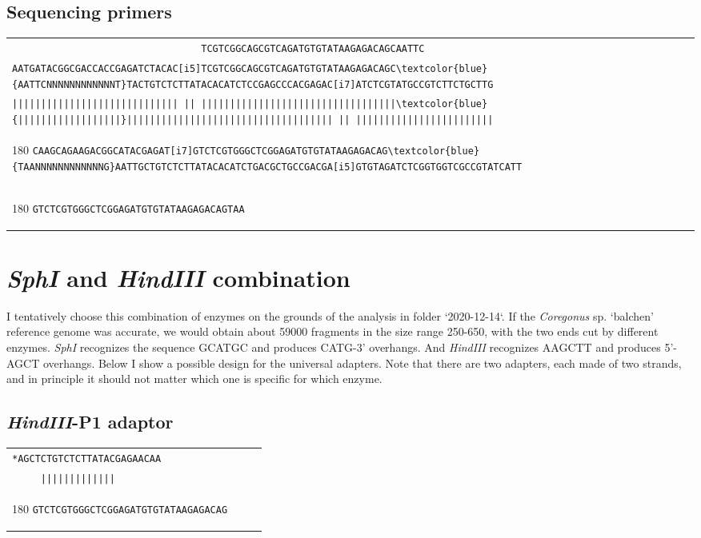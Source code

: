 \documentclass[a4paper,12pt]{article}
\begin{document}
\begin{flushleft}
\subsection*{Sequencing primers}
\begin{tabular}{l}
\Verb+                                 TCGTCGGCAGCGTCAGATGTGTATAAGAGACAGCAATTC+\\[-8pt]
\Verb+AATGATACGGCGACCACCGAGATCTACAC[i5]TCGTCGGCAGCGTCAGATGTGTATAAGAGACAGC\textcolor{blue}{AATTCNNNNNNNNNNNNT}TACTGTCTCTTATACACATCTCCGAGCCCACGAGAC[i7]ATCTCGTATGCCGTCTTCTGCTTG+\\[-10pt]
\Verb+||||||||||||||||||||||||||||| || ||||||||||||||||||||||||||||||||||\textcolor{blue}{||||||||||||||||||}|||||||||||||||||||||||||||||||||||| || ||||||||||||||||||||||||+\\[-12pt]
\begin{turn}{180}
   \Verb+CAAGCAGAAGACGGCATACGAGAT[i7]GTCTCGTGGGCTCGGAGATGTGTATAAGAGACAG\textcolor{blue}{TAANNNNNNNNNNNNG}AATTGCTGTCTCTTATACACATCTGACGCTGCCGACGA[i5]GTGTAGATCTCGGTGGTCGCCGTATCATT+
\end{turn}
\\[-8pt]
\begin{turn}{180}
   \Verb+GTCTCGTGGGCTCGGAGATGTGTATAAGAGACAGTAA                                                                                    +
\end{turn}
\\
\end{tabular}
\vspace*{0.3cm}


\section{\emph{SphI} and \emph{HindIII} combination}
I tentatively choose this combination of enzymes on the grounds of the analysis in folder `2020-12-14`. If the \emph{Coregonus} sp. `balchen' reference genome was accurate, we would obtain about 59000 fragments in the size range 250-650, with the two ends cut by different enzymes. \emph{SphI} recognizes the sequence \textsf{GCATGC} and produces \textsf{CATG}-3' overhangs. And \emph{HindIII} recognizes \textsf{AAGCTT} and produces 5'-\textsf{AGCT} overhangs. Below I show a possible design for the universal adapters. Note that there are two adapters, each made of two strands, and in principle it should not matter which one is specific for which enzyme.

\subsection*{\emph{HindIII}-P1 adaptor}
\begin{tabular}{l}
\verb+*AGCTCTGTCTCTTATACGAGAACAA+\\
\verb+     |||||||||||||+\\[-8pt]
   \begin{turn}{180}
   \verb+GTCTCGTGGGCTCGGAGATGTGTATAAGAGACAG     +
   \end{turn}
\\
\end{tabular}
\vspace*{0.3cm}


\end{flushleft}
\end{document}
